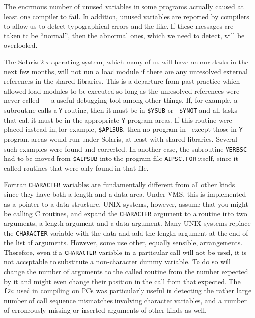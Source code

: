 \begin{description}
 The enormous number of unused
         variables in some programs actually caused at least one
         compiler to fail.  In addition, unused variables are reported
         by compilers to allow us to detect typographical errors and
         the like.  If these messages are taken to be ``normal'', then
         the abnormal ones, which we need to detect, will be
         overlooked.

 The Solaris
         2.{\it x} operating system, which many of us will have on our
         desks in the next few months, will not run a load module if
         there are any unresolved external references in the shared
         libraries.  This is a departure from past practice which
         allowed load modules to be executed so long as the unresolved
         references were never called --- a useful debugging tool
         among other things.  If, for example, a subroutine calls a
         {\tt Y} routine, then it must be in {\tt \$YSUB} or {\tt
         \$YNOT} and all tasks that call it must be in the appropriate
         {\tt Y} program areas.  If this routine were placed instead
         in, for example, {\tt \$APLSUB}, then no program in \AIPS\
         except those in {\tt Y} program areas would run under
         Solaris, at least with shared libraries.  Several such
         examples were found and corrected.  In another case, the
         subroutine {\tt VERBSC} had to be moved from {\tt \$AIPSUB}
         into the program file {\tt AIPSC.FOR} itself, since it called
         routines that were only found in that file.

         Fortran {\tt CHARACTER} variables are fundamentally different
         from all other kinds since they have both a length and a data
         area.  Under VMS, this is implemented as a pointer to a data
         structure.  UNIX systems, however, assume that you might be
         calling C routines, and expand the {\tt CHARACTER} argument
         to a routine into two arguments, a length argument and a data
         argument.  Many UNIX systems replace the {\tt CHARACTER}
         variable with the data and add the length argument at the end
         of the list of arguments.  However, some use other, equally
         sensible, arrangements.  Therefore, even if a {\tt CHARACTER}
         variable in a particular call will not be used, it is not
         acceptable to substitute a non-character dummy variable.  To
         do so will change the number of arguments to the called
         routine from the number expected by it and might even change
         their position in the call from that expected.  The {\tt f2c}
         used in compiling on PCs was particularly useful in detecting
         the rather large number of call sequence mismatches involving
         character variables, and a number of erroneously missing or
         inserted arguments of other kinds as well.


\end{description}
